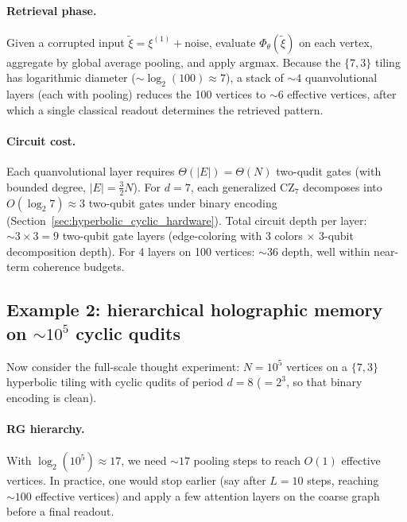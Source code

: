 \documentclass[11pt,oneside]{amsbook}
\numberwithin{equation}{section}
\theoremstyle{plain}
\theoremstyle{definition}
\theoremstyle{remark}
\begin{document}
\paragraph{Retrieval phase.}
Given a corrupted input $\tilde\xi=\xi^{(1)}+\text{noise}$, evaluate $\Phi_\theta(\tilde\xi)$
on each vertex, aggregate by global average pooling, and apply $\mathrm{argmax}$.
Because the $\{7,3\}$ tiling has logarithmic diameter ($\sim\log_2(100)\approx 7$),
a stack of $\sim 4$ quanvolutional layers (each with pooling) reduces the 100 vertices to
$\sim 6$ effective vertices, after which a single classical readout determines the retrieved
pattern.

\paragraph{Circuit cost.}
Each quanvolutional layer requires $\Theta(|E|)=\Theta(N)$ two-qudit gates (with bounded degree,
$|E|=\frac{3}{2}N$).  For $d=7$, each generalized $\mathrm{CZ}_7$ decomposes into
$O(\log_2 7)\approx 3$ two-qubit gates under binary encoding
(Section~\ref{sec:hyperbolic_cyclic_hardware}).
Total circuit depth per layer: $\sim 3\times 3 = 9$ two-qubit gate layers (edge-coloring with
3 colors $\times$ 3-qubit decomposition depth).
For 4 layers on 100 vertices: $\sim 36$ depth, well within near-term coherence budgets.

\subsection{Example 2: hierarchical holographic memory on $\sim 10^5$ cyclic qudits}
\label{subsec:qham_example_1e5}

Now consider the full-scale thought experiment: $N=10^5$ vertices on a $\{7,3\}$ hyperbolic
tiling with cyclic qudits of period $d=8$ ($=2^3$, so that binary encoding is clean).

\paragraph{RG hierarchy.}
With $\log_2(10^5)\approx 17$, we need $\sim 17$ pooling steps to reach $O(1)$ effective vertices.
In practice, one would stop earlier (say after $L=10$ steps, reaching $\sim 100$ effective vertices)
and apply a few attention layers on the coarse graph before a final readout.
\end{document}
